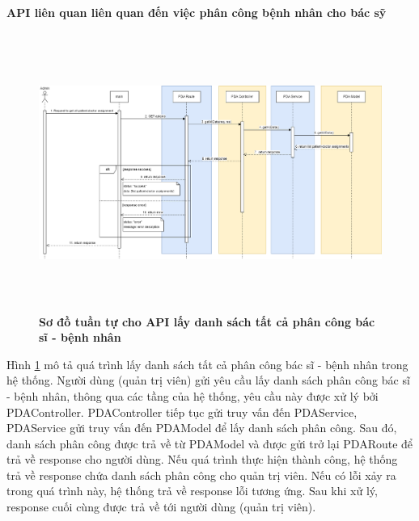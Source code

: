 
\paragraph{API liên quan liên quan đến việc phân công bệnh nhân cho bác sỹ}
\mbox{}


\begin{figure}[H]
  \centering
  \includegraphics[width=16cm,height=9cm]{Images/sequence_api/getAllPDA.png}
  \caption[Sơ đồ tuần tự cho API lấy danh sách tất cả phân công bác sĩ - bệnh nhân ]{\bfseries \fontsize{12pt}{0pt}
  \selectfont Sơ đồ tuần tự cho API lấy danh sách tất cả phân công bác sĩ - bệnh nhân }
  \label{api_getAllPDA} %
\end{figure}
Hình \ref{api_getAllPDA} mô tả quá trình lấy danh sách tất cả phân công bác sĩ - bệnh nhân trong hệ thống. Người dùng (quản trị viên) gửi yêu cầu lấy danh sách phân công bác sĩ - bệnh nhân, thông qua các tầng của hệ thống, 
yêu cầu này được xử lý bởi PDAController. PDAController tiếp tục gửi truy vấn đến PDAService, PDAService gửi truy vấn đến PDAModel để lấy danh sách phân công. Sau đó, danh sách phân công được trả về từ PDAModel và được gửi trở lại PDARoute
 để trả về response cho người dùng. Nếu quá trình thực hiện thành công, hệ thống trả về response chứa danh sách phân công cho quản trị viên. Nếu có lỗi xảy ra trong quá trình này, hệ thống trả về response lỗi tương ứng. Sau khi xử lý, response cuối cùng được 
trả về tới người dùng (quản trị viên).

